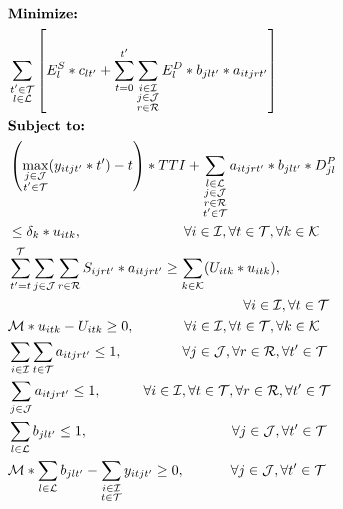 \documentclass[conference]{IEEEtran}
\begin{document}
\begin{align}
&\textbf{Minimize:}& \notag
\\
&\sum\limits_{\substack{t'\in\mathcal{T} \\ l\in\mathcal{L}}} \left[E^{S}_{l}* c_{lt'} + \sum\limits_{t=0}^{t'}\sum\limits_{\substack{{i\in\mathcal{I}} \\ {j\in\mathcal{J}} \\ r\in\mathcal{R}}}  E^{D}_{l} * b_{jlt'} * a_{itjrt'}  \right]
\label{eq:obj}
\\
&\textbf{Subject to:} \notag
\\
&\left(\max\limits_{\substack{j\in\mathcal{J} \\ {t'\in\mathcal{T}}}} (y_{itjt'}*t')-t\right) * TTI +\sum\limits_{\substack{{l\in\mathcal{L}} \\ {j\in\mathcal{J}} \\r\in\mathcal{R} \\ {t'\in\mathcal{T}}}} a_{itjrt'} * b_{jlt'} * D_{jl}^{P} \notag \\
&\leq \delta_{k} * u_{itk} , \;\quad\qquad\qquad\qquad \forall i\in\mathcal{I}, \forall t\in\mathcal{T},\forall k\in\mathcal{K}
\label{eq:delay} 
\\
&\sum\limits_{t'=t}^{\mathcal{T}}\sum\limits_{j\in\mathcal{J}} \sum\limits_{r\in\mathcal{R}}  S_{ijrt'} * a_{itjrt'} \geq \sum\limits_{k\in\mathcal{K}} (U_{itk} * u_{itk}), \notag \\
&\;\;\;\qquad\qquad\qquad\qquad\qquad\qquad\qquad\qquad \forall i\in\mathcal{I}, \forall t\in\mathcal{T}
\label{eq:QoS}
\\
&\mathcal{M} * u_{itk} - U_{itk} \geq 0, \;\;\qquad\quad\forall i\in\mathcal{I},\forall t\in\mathcal{T}, \forall k\in\mathcal{K}
\label{eq:Uandu} 
\\
&\sum\limits_{i\in\mathcal{I}}\sum\limits_{t\in\mathcal{T}} a_{itjrt'} \leq 1,\;\qquad\qquad\forall j\in\mathcal{J}, \forall r\in\mathcal{R},\forall t'\in\mathcal{T}
\label{eq:RBOneandOnly}
\\
&\sum\limits_{j\in\mathcal{J}} a_{itjrt'} \leq 1,\qquad\quad\forall i\in\mathcal{I},\forall t\in\mathcal{T}, \forall r\in\mathcal{R},\forall t'\in\mathcal{T}
\label{eq:RUOneandOnly}
\\
&\sum\limits_{l\in\mathcal{L}} b_{jlt'} \leq 1,\;\qquad\qquad\qquad\qquad\qquad\forall j\in\mathcal{J},\forall t'\in\mathcal{T}
\label{eq:DUOneandOnly}
\\
&\mathcal{M} * \sum\limits_{l\in\mathcal{L}} b_{jlt'} - \sum\limits_{\substack{{i\in\mathcal{I}} \\ {t\in\mathcal{T}}}} y_{itjt'} \geq 0,\;\qquad\quad\forall j\in\mathcal{J}, \forall t'\in\mathcal{T}

\end{align}
\end{document}
